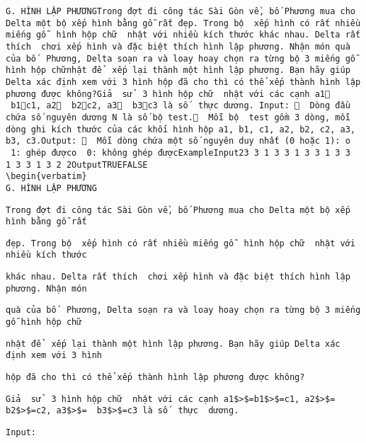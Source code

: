 
\begin{verbatim}
G. HÌNH LẬP PHƯƠNGTrong đợt đi công tác Sài Gòn về, bố Phương mua cho Delta một bộ xếp hình bằng gỗ rất đẹp. Trong bộ  xếp hình có rất nhiều miếng gỗ  hình hộp chữ  nhật với nhiều kích thước khác nhau. Delta rất thích  chơi xếp hình và đặc biệt thích hình lập phương. Nhận món quà của bố  Phương, Delta soạn ra và loay hoay chọn ra từng bộ 3 miếng gỗ hình hộp chữnhật để  xếp lại thành một hình lập phương. Bạn hãy giúp Delta xác định xem với 3 hình hộp đã cho thì có thể xếp thành hình lập phương được không?Giả  sử  3 hình hộp chữ  nhật với các cạnh a1  b1c1, a2  b2c2, a3  b3c3 là số  thực dương. Input:   Dòng đầu chứa số nguyên dương N là số bộ test.  Mỗi bộ  test gồm 3 dòng, mỗi dòng ghi kích thước của các khối hình hộp a1, b1, c1, a2, b2, c2, a3, b3, c3.Output:   Mỗi dòng chứa một số nguyên duy nhất (0 hoặc 1): o  1: ghép đượco  0: không ghép đượcExampleInput23 3 1 3 3 1 3 3 1 3 3 1 3 3 1 3 2 2OutputTRUEFALSE
\begin{verbatim}
G. HÌNH LẬP PHƯƠNG\end{verbatim}
\begin{verbatim}
Trong đợt đi công tác Sài Gòn về, bố Phương mua cho Delta một bộ xếp hình bằng gỗ rất \end{verbatim}
\begin{verbatim}
đẹp. Trong bộ  xếp hình có rất nhiều miếng gỗ  hình hộp chữ  nhật với nhiều kích thước \end{verbatim}
\begin{verbatim}
khác nhau. Delta rất thích  chơi xếp hình và đặc biệt thích hình lập phương. Nhận món \end{verbatim}
\begin{verbatim}
quà của bố  Phương, Delta soạn ra và loay hoay chọn ra từng bộ 3 miếng gỗ hình hộp chữ\end{verbatim}
\begin{verbatim}
nhật để  xếp lại thành một hình lập phương. Bạn hãy giúp Delta xác định xem với 3 hình \end{verbatim}
\begin{verbatim}
hộp đã cho thì có thể xếp thành hình lập phương được không?\end{verbatim}
\begin{verbatim}
Giả  sử  3 hình hộp chữ  nhật với các cạnh a1$>$=b1$>$=c1, a2$>$= b2$>$=c2, a3$>$=  b3$>$=c3 là số  thực  dương. \end{verbatim}
\begin{verbatim}
Input: \end{verbatim}
